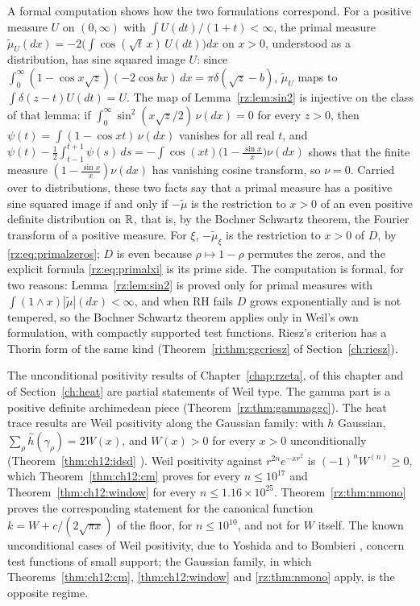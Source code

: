 A formal computation shows how the two formulations correspond. For a positive measure $U$ on $(0,\infty)$ with $\int U(dt)/(1+t)<\infty$, the primal measure $\tilde\mu_U(dx)=-2\bigl(\int\cos(\sqrt t\,x)\,U(dt)\bigr)dx$ on $x>0$, understood as a distribution, has sine squared image $U$: since $\int_0^\infty(1-\cos x\sqrt z)(-2\cos bx)\,dx=\pi\delta(\sqrt z-b)$, $\tilde\mu_U$ maps to $\int\delta(z-t)U(dt)=U$. The map of Lemma~\ref{rz:lem:sin2} is injective on the class of that lemma: if $\int_0^\infty\sin^2(x\sqrt z/2)\,\nu(dx)=0$ for every $z>0$, then $\psi(t)=\int(1-\cos xt)\,\nu(dx)$ vanishes for all real $t$, and $\psi(t)-\frac12\int_{t-1}^{t+1}\psi(s)\,ds=-\int\cos(xt)\bigl(1-\frac{\sin x}x\bigr)\nu(dx)$ shows that the finite measure $(1-\frac{\sin x}x)\nu(dx)$ has vanishing cosine transform, so $\nu=0$. Carried over to distributions, these two facts say that a primal measure has a positive sine squared image if and only if $-\tilde\mu$ is the restriction to $x>0$ of an even positive definite distribution on $\mathbb{R}$, that is, by the Bochner Schwartz theorem, the Fourier transform of a positive measure. For $\xi$, $-\tilde\mu_\xi$ is the restriction to $x>0$ of $D$, by \eqref{rz:eq:primalzeros}; $D$ is even because $\rho\mapsto1-\rho$ permutes the zeros, and the explicit formula \eqref{rz:eq:primalxi} is its prime side. The computation is formal, for two reasons: Lemma~\ref{rz:lem:sin2} is proved only for primal measures with $\int(1\wedge x)|\tilde\mu|(dx)<\infty$, and when RH fails $D$ grows exponentially and is not tempered, so the Bochner Schwartz theorem applies only in Weil's own formulation, with compactly supported test functions. Riesz's criterion has a Thorin form of the same kind (Theorem~\ref{ri:thm:ggcriesz} of Section~\ref{ch:riesz}).

The unconditional positivity results of Chapter~\ref{chap:rzeta}, of this chapter and of Section~\ref{ch:heat} are partial statements of Weil type. The gamma part is a positive definite archimedean piece (Theorem~\ref{rz:thm:gammaggc}). The heat trace results are Weil positivity along the Gaussian family: with $h$ Gaussian, $\sum_\rho\hat h(\gamma_\rho)=2W(x)$, and $W(x)>0$ for every $x>0$ unconditionally (Theorem~\ref{thm:ch12:idsd} \cite[Theorem A]{P26}). Weil positivity against $r^{2n}e^{-xr^2}$ is $(-1)^nW^{(n)}\ge0$, which Theorem~\ref{thm:ch12:cm} \cite[Theorem 7.10]{P17} proves for every $n\le10^{17}$ and Theorem~\ref{thm:ch12:window} for every $n\le1.16\times10^{25}$. Theorem~\ref{rz:thm:nmono} proves the corresponding statement for the canonical function $k=W+c/(2\sqrt{\pi x})$ of the floor, for $n\le10^{10}$, and not for $W$ itself. The known unconditional cases of Weil positivity, due to Yoshida \cite[Theorem 1]{Yoshida92} and to Bombieri \cite{Bombieri}, concern test functions of small support; the Gaussian family, in which Theorems~\ref{thm:ch12:cm}, \ref{thm:ch12:window} and \ref{rz:thm:nmono} apply, is the opposite regime.


